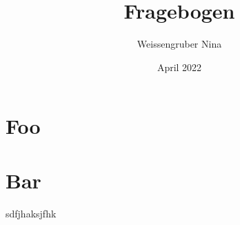 \documentclass[12pt]{article}
\author{Weissengruber Nina}
\title{\vspace{-2cm} Fragebogen}
\date{\vspace{-18mm}April 2022}
\begin{document}
\maketitle


\section{Foo}
\section{Bar}
sdfjhaksjfhk



\end{document}
